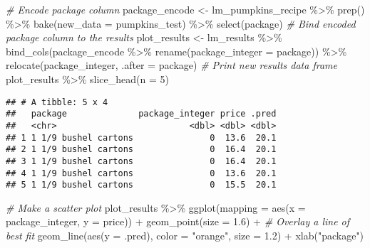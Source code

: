 \documentclass[
]{article}
\newenvironment{Shaded}{\begin{snugshade}}{\end{snugshade}}
\newcommand{\AttributeTok}[1]{\textcolor[rgb]{0.77,0.63,0.00}{#1}}
\newcommand{\CommentTok}[1]{\textcolor[rgb]{0.56,0.35,0.01}{\textit{#1}}}
\newcommand{\DecValTok}[1]{\textcolor[rgb]{0.00,0.00,0.81}{#1}}
\newcommand{\FloatTok}[1]{\textcolor[rgb]{0.00,0.00,0.81}{#1}}
\newcommand{\FunctionTok}[1]{\textcolor[rgb]{0.00,0.00,0.00}{#1}}
\newcommand{\NormalTok}[1]{#1}
\newcommand{\OtherTok}[1]{\textcolor[rgb]{0.56,0.35,0.01}{#1}}
\newcommand{\SpecialCharTok}[1]{\textcolor[rgb]{0.00,0.00,0.00}{#1}}
\newcommand{\StringTok}[1]{\textcolor[rgb]{0.31,0.60,0.02}{#1}}
\begin{document}
\begin{Shaded}
\begin{Highlighting}[]
\CommentTok{\# Encode package column}
\NormalTok{package\_encode }\OtherTok{\textless{}{-}}\NormalTok{ lm\_pumpkins\_recipe }\SpecialCharTok{\%\textgreater{}\%} 
  \FunctionTok{prep}\NormalTok{() }\SpecialCharTok{\%\textgreater{}\%} 
  \FunctionTok{bake}\NormalTok{(}\AttributeTok{new\_data =}\NormalTok{ pumpkins\_test) }\SpecialCharTok{\%\textgreater{}\%} 
  \FunctionTok{select}\NormalTok{(package)}
\CommentTok{\# Bind encoded package column to the results}
\NormalTok{ plot\_results }\OtherTok{\textless{}{-}}\NormalTok{ lm\_results }\SpecialCharTok{\%\textgreater{}\%}
 \FunctionTok{bind\_cols}\NormalTok{(package\_encode }\SpecialCharTok{\%\textgreater{}\%}
               \FunctionTok{rename}\NormalTok{(}\AttributeTok{package\_integer =}\NormalTok{ package)) }\SpecialCharTok{\%\textgreater{}\%}
  \FunctionTok{relocate}\NormalTok{(package\_integer, }\AttributeTok{.after =}\NormalTok{ package)}
\CommentTok{\# Print new results data frame}
\NormalTok{plot\_results }\SpecialCharTok{\%\textgreater{}\%}
  \FunctionTok{slice\_head}\NormalTok{(}\AttributeTok{n =} \DecValTok{5}\NormalTok{)}
\end{Highlighting}
\end{Shaded}

\begin{verbatim}
## # A tibble: 5 x 4
##   package              package_integer price .pred
##   <chr>                          <dbl> <dbl> <dbl>
## 1 1 1/9 bushel cartons               0  13.6  20.1
## 2 1 1/9 bushel cartons               0  16.4  20.1
## 3 1 1/9 bushel cartons               0  16.4  20.1
## 4 1 1/9 bushel cartons               0  13.6  20.1
## 5 1 1/9 bushel cartons               0  15.5  20.1
\end{verbatim}

\begin{Shaded}
\begin{Highlighting}[]
\CommentTok{\# Make a scatter plot}
\NormalTok{plot\_results }\SpecialCharTok{\%\textgreater{}\%}
  \FunctionTok{ggplot}\NormalTok{(}\AttributeTok{mapping =} \FunctionTok{aes}\NormalTok{(}\AttributeTok{x =}\NormalTok{ package\_integer, }\AttributeTok{y =}\NormalTok{ price)) }\SpecialCharTok{+}
   \FunctionTok{geom\_point}\NormalTok{(}\AttributeTok{size =} \FloatTok{1.6}\NormalTok{) }\SpecialCharTok{+}
   \CommentTok{\# Overlay a line of best fit}
   \FunctionTok{geom\_line}\NormalTok{(}\FunctionTok{aes}\NormalTok{(}\AttributeTok{y =}\NormalTok{ .pred), }\AttributeTok{color =} \StringTok{"orange"}\NormalTok{, }\AttributeTok{size =} \FloatTok{1.2}\NormalTok{) }\SpecialCharTok{+}
   \FunctionTok{xlab}\NormalTok{(}\StringTok{"package"}\NormalTok{)}
\end{Highlighting}
\end{Shaded}
\end{document}
